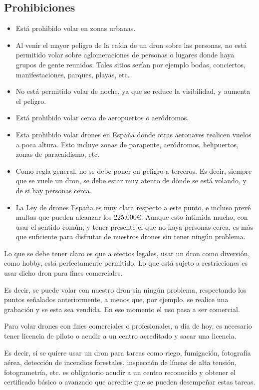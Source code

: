 \subsection{Prohibiciones}

\begin{itemize}
\item Está prohibido volar en zonas urbanas.
\item Al venir el mayor peligro de la caída de un dron sobre las personas, no está permitido volar sobre aglomeraciones de personas o lugares donde haya grupos de gente reunidos. Tales sitios serían por ejemplo bodas, conciertos, manifestaciones, parques, playas, etc.
\item No está permitido volar de noche, ya que se reduce la visibilidad, y aumenta el peligro. 
\item Está prohibido volar cerca de aeropuertos o aeródromos.
\item Esta prohibido volar drones en España donde otras aeronaves realicen vuelos a poca altura. Esto incluye zonas de parapente, aeródromos, helipuertos, zonas de paracaidismo, etc.
\item Como regla general, no se debe poner en peligro a terceros. Es decir, siempre que se vuele un dron, se debe estar muy atento de dónde se está volando, y de si hay personas cerca.
\item La Ley de drones España es muy clara respecto a este punto, e incluso prevé multas que pueden alcanzar los 225.000€. Aunque esto intimida mucho, con usar el sentido común, y tener presente el que no haya personas cerca, es más que suficiente para disfrutar de nuestros drones sin tener ningún problema.
\end{itemize}

Lo que se debe tener claro es que a efectos legales, usar un dron como diversión, como hobby, está perfectamente permitido. Lo que está sujeto a restricciones  es usar dicho dron para fines comerciales.

Es decir, se puede volar con nuestro dron sin ningún problema, respectando los puntos señalados anteriormente, a menos que, por ejemplo,  se realice una grabación y se esta sea vendida. En ese momento el uso pasa a ser comercial.

Para volar drones con fines comerciales o profesionales, a día de hoy, es necesario tener licencia de piloto o acudir a un centro acreditado y sacar una licencia.

Es decir, si se quiere usar un dron para tareas como riego, fumigación, fotografía aérea, detección de incendios forestales, inspección de líneas de alta tensión,  fotogrametría, etc. es obligatorio acudir a un centro reconocido y obtener el certificado básico o avanzado que acredite que se pueden desempeñar estas tareas.

